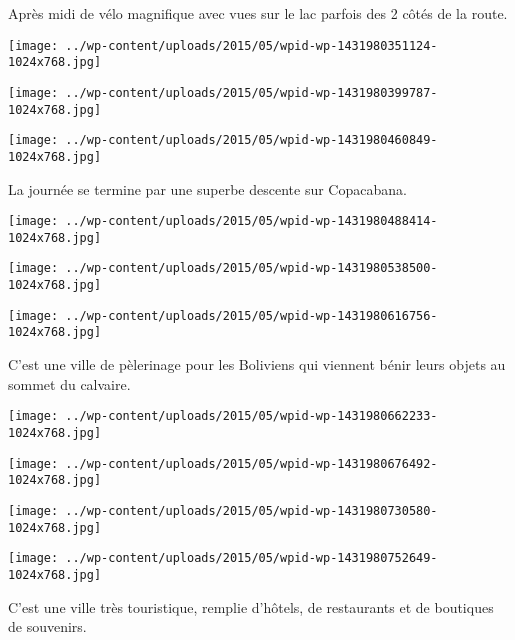  Après midi de vélo magnifique avec vues sur le lac parfois des 2 côtés de la route. \newline
 \newline
\centerline{\texttt{[image: ../wp-content/uploads/2015/05/wpid-wp-1431980351124-1024x768.jpg]} } 
 \newline
 \newline
\centerline{\texttt{[image: ../wp-content/uploads/2015/05/wpid-wp-1431980399787-1024x768.jpg]} } 
 \newline
 \newline
\centerline{\texttt{[image: ../wp-content/uploads/2015/05/wpid-wp-1431980460849-1024x768.jpg]} } 
 \newline
 La journée se termine par une superbe descente sur Copacabana. \newline
 \newline
\centerline{\texttt{[image: ../wp-content/uploads/2015/05/wpid-wp-1431980488414-1024x768.jpg]} } 
 \newline
 \newline
\centerline{\texttt{[image: ../wp-content/uploads/2015/05/wpid-wp-1431980538500-1024x768.jpg]} } 
 \newline
 \newline
\centerline{\texttt{[image: ../wp-content/uploads/2015/05/wpid-wp-1431980616756-1024x768.jpg]} } 
 \newline
 C'est une ville de pèlerinage pour les Boliviens qui viennent bénir leurs objets au sommet du calvaire. \newline
 \newline
\centerline{\texttt{[image: ../wp-content/uploads/2015/05/wpid-wp-1431980662233-1024x768.jpg]} } 
 \newline
 \newline
\centerline{\texttt{[image: ../wp-content/uploads/2015/05/wpid-wp-1431980676492-1024x768.jpg]} } 
 \newline
 \newline
\centerline{\texttt{[image: ../wp-content/uploads/2015/05/wpid-wp-1431980730580-1024x768.jpg]} } 
 \newline
 \newline
\centerline{\texttt{[image: ../wp-content/uploads/2015/05/wpid-wp-1431980752649-1024x768.jpg]} } 
 \newline
 C'est une ville très touristique, remplie d'hôtels, de restaurants et de boutiques de souvenirs. \newline

